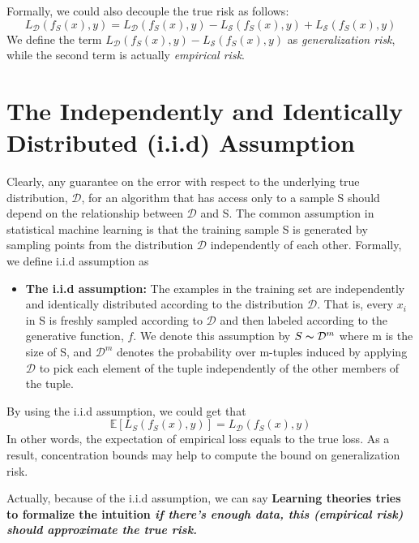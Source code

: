 \documentclass{article}[12pt]
\begin{document}
Formally, we could also decouple the true risk as follows:
\begin{equation*}
    L_{\mathcal{D}}(f_S(x),y) = L_{\mathcal{D}}(f_S(x),y) - L_{\mathcal{S}}(f_S(x),y)  + L_{\mathcal{S}}(f_S(x),y) 
\end{equation*}
We define the term $L_{\mathcal{D}}(f_S(x),y)  - L_{\mathcal{S}}(f_S(x),y) $ as \textit{generalization risk}, while the second term is actually \textit{empirical risk}.

\section{The Independently and Identically Distributed (i.i.d) Assumption}
Clearly, any guarantee on the error with respect to the underlying true distribution, $\mathcal{D}$, for an algorithm that has access only to a sample S should depend on the relationship between $\mathcal{D}$ and S. The common assumption in statistical machine learning is that the training sample S is generated by sampling points from the distribution $\mathcal{D}$ independently of each other. Formally, we define i.i.d assumption as

\begin{itemize}

    \item \textbf{The i.i.d assumption:} The examples in the training set are independently and identically distributed according to the distribution $\mathcal{D}$. That is, every $x_i$ in S is freshly sampled according to $\mathcal{D}$ and then labeled according to the generative function, $f$. We denote this assumption by $S \thicksim \mathcal{D}^m$ where m is the size of S, and $\mathcal{D}^m$ denotes the probability over m-tuples induced by applying $\mathcal{D}$ to pick each element of the tuple independently of the other members of the tuple.
\end{itemize}

By using the i.i.d assumption, we could get that 
\begin{equation*}
    \mathbb{E}[L_S(f_S(x),y)]= L_{\mathcal{D}}(f_S(x),y) 
\end{equation*}In other words, the expectation of empirical loss equals to the true loss. As a result, concentration bounds may help to compute the bound on generalization risk.

Actually, because of the i.i.d assumption, we can say \textbf{Learning theories tries to formalize the intuition \textit{if there's enough data, this (empirical risk) should approximate the true risk.}}
\end{document}
